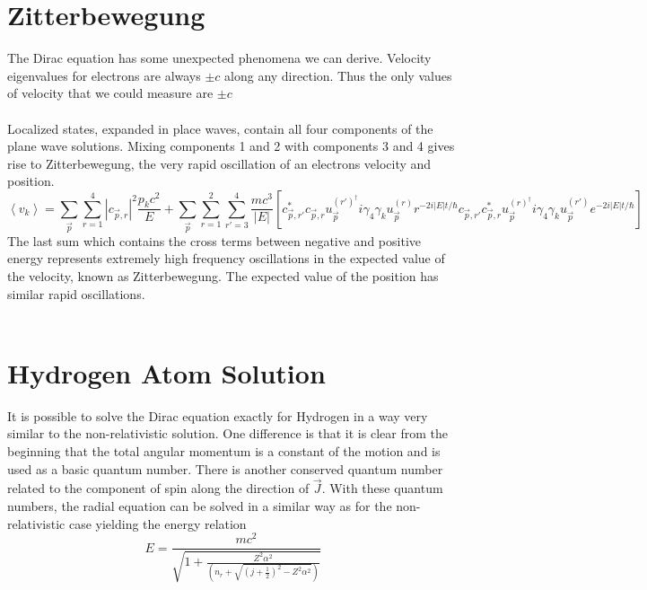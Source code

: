 \documentclass{report}
\begin{document}
\section{Zitterbewegung}
The Dirac equation has some unexpected phenomena we can derive. Velocity eigenvalues for electrons are always  $\pm c$ along any direction. Thus the only values of velocity that we could measure are $\pm c$
\\
\\
Localized states, expanded in place waves, contain all four components of the plane wave solutions. Mixing components 1 and 2 with components 3 and 4 gives rise to Zitterbewegung, the very rapid oscillation of an electrons velocity and position.
\begin{equation}
	\left<v_{k}\right> = \sum_{\vec{p}} \sum_{r=1}^{4} \left| c_{\vec{p},r} \right|^2 \frac{p_{k}c^2}{E} + \sum_{\vec{p}} \sum_{r=1}^{2} \sum_{r'=3}^{4} \frac{mc^{3}}{\left| E \right| } \left[ c^{*}_{\vec{p},r'} c_{\vec{p},r} u^{(r')^{\dagger}}_{\vec{p}}i \gamma_4 \gamma_{k}u^{(r)}_{\vec{p}} r^{-2i \left| E \right|t / \hbar }c_{\vec{p},r'}c^{*}_{\vec{p},r} u^{(r)^{\dagger}}_{\vec{p}} i \gamma_4 \gamma_{k} u^{(r')}_{\vec{p}} e^{-2i \left| E \right| t / \hbar} \right]
\end{equation}
The last sum which contains the cross terms between negative and positive energy represents extremely high frequency oscillations in the expected value of the velocity, known as Zitterbewegung. The expected value of the position has similar rapid oscillations.
\\
\\

\section{Hydrogen Atom Solution}
It is possible to solve the Dirac equation exactly for Hydrogen in a way very similar to the non-relativistic solution. One difference is that it is clear from the beginning that the total angular momentum is a constant of the motion and is used as a basic quantum number. There is another conserved quantum number related to the component of spin along the direction of $\vec{J}$. With these quantum numbers, the radial equation can be solved in a similar way as for the non-relativistic case yielding the energy relation
\begin{equation}
	E = \frac{mc^2}{\sqrt{1 + \frac{Z^2 \alpha^2}{\left( n_{r} + \sqrt{\left( j + \frac{1}{2} \right)^2 - Z^2 \alpha^2 }  \right) }} }
\end{equation}
\end{document}
